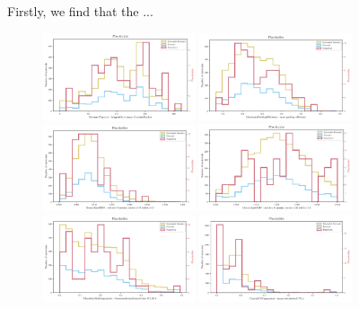 \documentclass[superscriptaddress,unsortedaddress,
 amsmath,amssymb,
 aps,
]{revtex4-2}
\begin{document}
Firstly, we find that the ... 


\begin{figure}[h!]
    \centering
    \includegraphics[width=0.4\textwidth]{figures/histograms/new/ElementProperty_MagpieData range CovalentRadius_count_075.pdf}
    \includegraphics[width=0.4\textwidth]{figures/histograms/new/MaximumPackingEfficiency_max packing efficiency_count_075.pdf}
    \includegraphics[width=0.4\textwidth]{figures/histograms/new/GeneralizedRDF_std_dev Gaussian center=2.0 width=1.0_count_075.pdf}
    \includegraphics[width=0.4\textwidth]{figures/histograms/new/GeneralizedRDF_std_dev Gaussian center=3.0 width=1.0_count_075.pdf}
    \includegraphics[width=0.4\textwidth]{figures/histograms/new/ChemEnvSiteFingerprint_GaussianSymmFuncstd_dev G2_20.0_count_075.pdf}
    \includegraphics[width=0.4\textwidth]{figures/histograms/new/CrystalNNFingerprint_mean tetrahedral CN_4_count_075.pdf} 

\end{figure}
\end{document}
